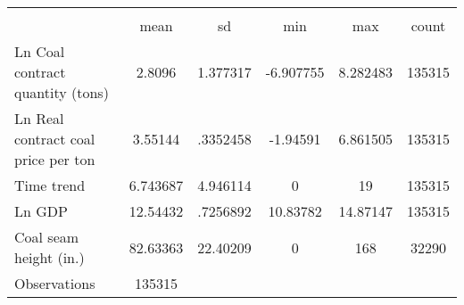 {
\def\sym#1{\ifmmode^{#1}\else\(^{#1}\)\fi}
\begin{tabular}{l*{1}{ccccc}}
\hline\hline
                    &\multicolumn{5}{c}{}                                            \\
                    &        mean&          sd&         min&         max&       count\\
\hline
Ln Coal contract quantity (tons)&      2.8096&    1.377317&   -6.907755&    8.282483&      135315\\
Ln Real contract coal price per ton&     3.55144&    .3352458&    -1.94591&    6.861505&      135315\\
Time trend          &    6.743687&    4.946114&           0&          19&      135315\\
Ln GDP              &    12.54432&    .7256892&    10.83782&    14.87147&      135315\\
Coal seam height (in.)&    82.63363&    22.40209&           0&         168&       32290\\
\hline
Observations        &      135315&            &            &            &            \\
\hline\hline
\end{tabular}
}
